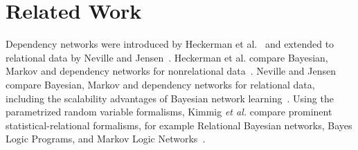\documentclass[runningheads,a4paper]{llncs}
\newcommand{\etal}{\textit{et al.}}
\begin{document}


\section{Related Work} \label{sec:related}
Dependency networks were introduced by Heckerman et al.~\cite{Heckerman2000} and extended to relational data by Neville and Jensen~\cite{Neville2007}. 
Heckerman et al. compare Bayesian, Markov and dependency networks for nonrelational data~\cite{Heckerman2000}. Neville and Jensen compare Bayesian, Markov and dependency networks for relational data, including the scalability advantages of Bayesian network learning~\cite[Sec.8.5.1]{Neville2007}. Using the parametrized random variable formalisms, Kimmig \etal{} compare prominent statistical-relational formalisms, for example Relational Bayesian networks, Bayes Logic Programs, and Markov Logic Networks~\cite{Kimmig2014}.
\end{document}
